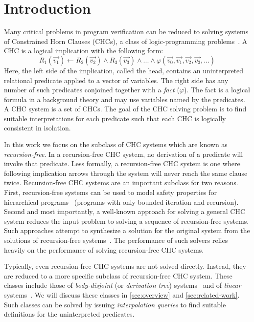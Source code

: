\section{Introduction}
\label{sec:intro}
Many critical problems in program verification can be reduced to
solving systems of Constrained Horn Clauses (CHCs), a class of
logic-programming
problems~\cite{bjorner13,flanagan03,rummer13a,rummer13b}.
%
A CHC is a logical implication with the following form:
$$
  R_1(\vec{v_1}) \leftarrow R_2(\vec{v_2}) \land R_3(\vec{v_3}) \land
  ... \land \varphi(\vec{v_0}, \vec{v_1}, \vec{v_2}, \vec{v_3},...)
$$
Here, the left side of the implication, called the head, contains an
uninterpreted relational predicate applied to a vector of variables.
%
The right side has any number of such predicates conjoined together
with a \emph{fact} ($\varphi$). The fact is a logical formula in a background
theory and may use variables named by the predicates.
%
A CHC system is a set of CHCs.
%
The goal of the CHC solving problem is to find suitable interpretations
for each predicate such that each CHC is logically
consistent in isolation.

In this work we focus on the subclass of CHC systems which are known
as \emph{recursion-free}. In a recursion-free CHC system, no
derivation of a predicate will invoke that predicate.
%
Less formally, a recursion-free CHC system is one where following
implication arrows through the system will never reach the same clause
twice.
%
Recursion-free CHC systems are an important subclass for two reasons.
%
First, recursion-free systems can be used to model safety properties
for hierarchical programs~\cite{lal-qadeer15,lal-qadeer-lahiri12}
(programs with only bounded iteration and recursion).
%
Second and most importantly, a well-known approach for solving a
general CHC system reduces the input problem to solving a sequence
of recursion-free systems.
%
Such approaches attempt to synthesize a solution for the   original
system from the solutions of recursion-free systems~\cite{bjorner13}.
%
The performance of such solvers relies
heavily on the performance of solving recursion-free CHC systems.
%

Typically, even recursion-free CHC systems are not solved directly.
%
Instead, they are reduced to a more specific subclass of
recursion-free CHC system.
%
These classes include those of
\emph{body-disjoint} (or \emph{derivation tree})
systems~\cite{heizmann10,bjorner13,mcmillan14,rummer13a,rummer13b} and
of \emph{linear} systems~\cite{albarghouthi12a}.
%
We will discuss these classes in \autoref{sec:overview} and
\autoref{sec:related-work}.
%
Such classes can be solved by issuing
\emph{interpolation queries} to find suitable definitions for the
uninterpreted predicates.
%

